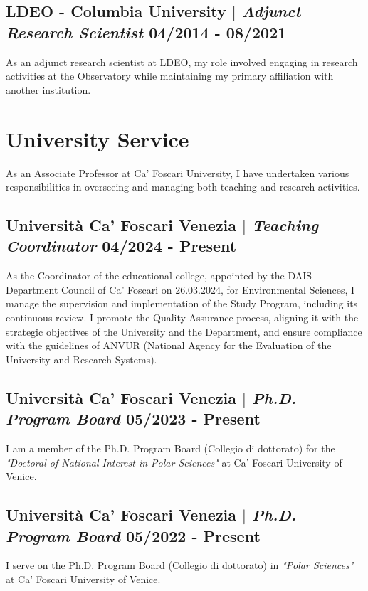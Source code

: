 \documentclass[11pt]{article}
\begin{document}
\subsection{LDEO - Columbia University $|$ {\normalfont\textit{Adjunct Research Scientist}} \hfill 04/2014 - 08/2021}
{\footnotesize As an adjunct research scientist at LDEO, my role involved engaging in research activities at the Observatory while maintaining my primary affiliation with another institution.}

\section{University Service}
{\normalfont As an Associate Professor at Ca' Foscari University, I have undertaken various responsibilities in overseeing and managing both teaching and research activities.}\\
\bigskip
\subsection{Università Ca' Foscari Venezia  $|$ {\normalfont\textit{Teaching Coordinator}} \hfill 04/2024 - Present}
{\footnotesize As the Coordinator of the educational college, appointed by the DAIS Department Council of Ca' Foscari on 26.03.2024, for Environmental Sciences, I manage the supervision and implementation of the Study Program, including its continuous review. I promote the Quality Assurance process, aligning it with the strategic objectives of the University and the Department, and ensure compliance with the guidelines of ANVUR (National Agency for the Evaluation of the University and Research Systems).}

\bigskip

\subsection{Università Ca' Foscari Venezia $|$ {\normalfont\textit{Ph.D. Program Board}} \hfill 05/2023 - Present}
{\footnotesize I am a member of the Ph.D. Program Board (Collegio di dottorato) for the \textit{"Doctoral of National Interest in Polar Sciences"} at Ca' Foscari University of Venice.}
\bigskip

\subsection{Università Ca' Foscari Venezia $|$ {\normalfont\textit{Ph.D. Program Board}} \hfill 05/2022 - Present}
{\footnotesize I serve on the Ph.D. Program Board (Collegio di dottorato) in \textit{"Polar Sciences"} at Ca' Foscari University of Venice.}
\bigskip
\end{document}
